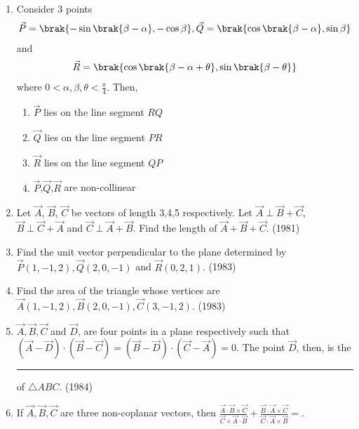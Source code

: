 \begin{enumerate}[label=\thesubsection.\arabic*.,ref=\thesubsection.\theenumi]
        \item Consider 3 points 
            \begin{align*}
                \vec{P}=\brak{-\sin \brak{\beta - \alpha}, - \cos\beta}, \vec{Q} = \brak{\cos \brak{\beta - \alpha}, \sin\beta}
            \end{align*} and 
            \begin{align*} \vec{R} = \brak{\cos \brak{\beta - \alpha + \theta}, \sin\brak{\beta - \theta}} \end{align*} where $0<\alpha,\beta,\theta<\frac{\pi}{4}$. Then, 
  \begin{multicols}{2}
                \begin{enumerate}
                    \item $\vec{P}$ lies on the line segment $RQ$
                    \item $\vec{Q}$ lies on the line segment $PR$
                    \item $\vec{R}$ lies on the line segment $QP$
                    \item $\vec{P}$,$\vec{Q}$,$\vec{R}$ are non-collinear
                \end{enumerate}
  \end{multicols}
\hfill {}
    \item Let $\vec{A}$, $\vec{B}$, $\vec{C}$ be vectors of length 3,4,5 respectively. Let $\vec{A} \perp \vec{B}+\vec{C}$, $\vec{B}\perp \vec{C}+\vec{A}$ and $\vec{C} \perp \vec{A}+\vec{B}$. Find  the length of $\vec{A}+\vec{B}+\vec{C}$. 
    \hfill (1981)
    \item Find the unit vector perpendicular to the plane determined by $\vec{P}(1,-1,2), \vec{Q}(2,0,-1)$ and $\vec{R}(0,2,1)$.
    \hfill (1983)
    \item Find the area of the triangle whose vertices are $\vec{A}(1,-1,2), \vec{B}(2,0,-1), \vec{C}(3,-1,2)$. 
    \hfill (1983)
    \item $\vec{A}, \vec{B}, \vec{C}$ and $\vec{D}$, are four points in a plane respectively such that $(\vec{A}-\vec{D})\cdot(\vec{B}-\vec{C})=(\vec{B}-\vec{D})\cdot(\vec{C}-\vec{A})=0$.
	    The point $\vec{D}$, then, is the \rule{1cm}{0.01pt} of $\triangle ABC$.
    \hfill (1984)
\item If $\vec{A}, \vec{B}, \vec{C}$ are three non-coplanar vectors, then $\frac{\vec{A}\cdot\vec{B}\times\vec{C}}{\vec{C}\times\vec{A}\cdot\vec{B}}+\frac{\vec{B}\cdot\vec{A}\times\vec{C}}{\vec{C}\cdot\vec{A}\times\vec{B}}=$.

\end{enumerate}
